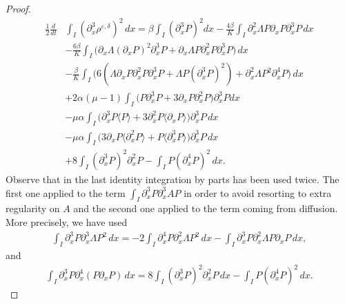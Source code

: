 \documentclass[12pt]{amsart}
\newcommand{\D}{\,d}
\begin{document}
\begin{proof}
            \begin{align*}
                \frac{1}{2}\frac{d}{dt}&\int_I(\partial_{x}^3\rho^{\varepsilon,\delta})^2\D x= \beta \int_I (\partial_x^3 P)^2dx -\frac{4\beta}{K} \int_I \partial_x^2 \Lambda P \partial_x P \partial_x^3 P \D x \\
                &-\frac{6\beta}{K}\int_I \Big( \partial_x \Lambda  (\partial_x P)^2 \partial_x^3 P   + \partial_x \Lambda   P \partial_x^2 P \partial_x^3 P \Big)\D x   \\
                &-\frac{\beta}{K} \int_I \Big( 6(\Lambda \partial_x P \partial_x^2 P \partial_x^3 P  +  \Lambda P (\partial_x^3 P)^2)    + \partial_x^2 \Lambda  P^2 \partial_x^4 P \Big)\D x  \\
                &+ 2\alpha(\mu-1)\int_I \Big(   P \partial_x^3 P  + 3 \partial_x P\partial_x^2 P \Big)\partial_x^3 P dx\\
                &- \mu \alpha \int_I \Big(    \partial_x^3 P\langle P \rangle  + 3\partial_x^2 P\langle  \partial_{x} P \rangle \Big)\partial_x^3 P \D x\\
                &- \mu \alpha \int_I  \Big(
                3\partial_x P\langle  \partial_{x}^2 P \rangle +
                P\langle  \partial_{x}^3 P \rangle\Big)\partial_x^3 P \D x\\
                &+8\int_I (\partial_x^3 P)^2\partial_x^2 P-\int_IP(\partial_x^4 P)^2 \D x.
            \end{align*}
        Observe that in the last identity integration by parts has been used twice. The first one applied to the term $\int_I \partial_x^3 P \partial_x^3 A P $ in order to avoid resorting to extra regularity on $A$ and the second one applied to the term coming from diffusion. More precisely, we have used
        \begin{equation*}
            \begin{split}
                \int_I \partial_x^3 P \partial_x^3 \Lambda P^2 \D x
                =-2\int_I \partial_x^4 P \partial_x^2 \Lambda P^2 \D x -\int_I \partial_x^3 P \partial_x^2 \Lambda P \partial_x P \D x,
            \end{split}
        \end{equation*}
        and
        \begin{equation*}
        \begin{split}
            \int_I \partial_x^3 P \partial_x^4(P\partial_x P) \D x= 8\int_I (\partial_x^3 P)^2 \partial_x^2 P \D x -\int_I P (\partial_x^4 P)^2\D x.
            \end{split}
        \end{equation*}




\end{proof}
\end{document}
